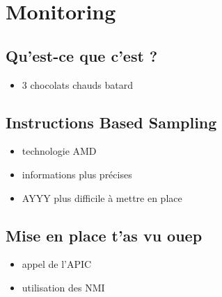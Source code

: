 \documentclass{beamer}
\newcommand{\bframe}{\begin{frame}{\secname}{\subsecname}}
\begin{document}
  \section{Monitoring}
    \subsection{Qu'est-ce que c'est ?}
      \bframe
        \begin{itemize}
          \item 3 chocolats chauds batard
        \end{itemize}
      \end{frame}

    \subsection{Instructions Based Sampling}
      \bframe
        \begin{itemize}
          \item technologie AMD 
          \item<2-3> informations plus précises
          \item<3> AYYY plus difficile à mettre en place
        \end{itemize}
      \end{frame}

    \subsection{Mise en place t'as vu ouep}
      \bframe
        \begin{itemize}
          \item appel de l'APIC
          \item utilisation des NMI
        \end{itemize}
      \end{frame}


    
\end{document}
